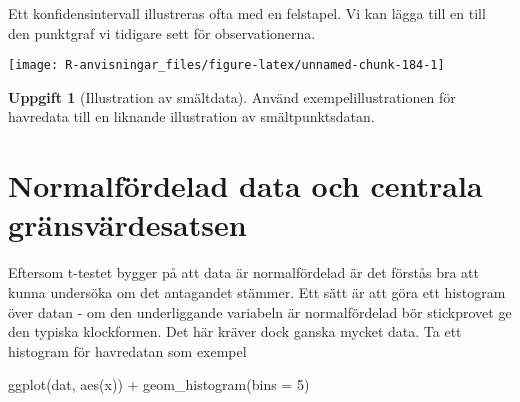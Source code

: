 \documentclass[
]{book}
\newenvironment{Shaded}{\begin{snugshade}}{\end{snugshade}}
\newcommand{\AttributeTok}[1]{\textcolor[rgb]{0.77,0.63,0.00}{#1}}
\newcommand{\DecValTok}[1]{\textcolor[rgb]{0.00,0.00,0.81}{#1}}
\newcommand{\FloatTok}[1]{\textcolor[rgb]{0.00,0.00,0.81}{#1}}
\newcommand{\FunctionTok}[1]{\textcolor[rgb]{0.00,0.00,0.00}{#1}}
\newcommand{\NormalTok}[1]{#1}
\newcommand{\OtherTok}[1]{\textcolor[rgb]{0.56,0.35,0.01}{#1}}
\newcommand{\SpecialCharTok}[1]{\textcolor[rgb]{0.00,0.00,0.00}{#1}}
\newcommand{\StringTok}[1]{\textcolor[rgb]{0.31,0.60,0.02}{#1}}
\theoremstyle{definition}
\theoremstyle{definition}
\theoremstyle{definition}
\newtheorem{exercise}{Uppgift}[chapter]
\theoremstyle{definition}
\theoremstyle{remark}
\begin{document}
Ett konfidensintervall illustreras ofta med en felstapel. Vi kan lägga till en till den punktgraf vi tidigare sett för observationerna.

\begin{Shaded}
\end{Shaded}

\begin{center}\texttt{[image: R-anvisningar\_files/figure-latex/unnamed-chunk-184-1]} \end{center}

\begin{exercise}[Illustration av smältdata]
Använd exempelillustrationen för havredata till en liknande illustration av smältpunktsdatan.
\end{exercise}

\hypertarget{normalfuxf6rdelad-data-och-centrala-gruxe4nsvuxe4rdesatsen}{%
\section{Normalfördelad data och centrala gränsvärdesatsen}\label{normalfuxf6rdelad-data-och-centrala-gruxe4nsvuxe4rdesatsen}}

Eftersom t-testet bygger på att data är normalfördelad är det förstås bra att kunna undersöka om det antagandet stämmer. Ett sätt är att göra ett histogram över datan - om den underliggande variabeln är normalfördelad bör stickprovet ge den typiska klockformen. Det här kräver dock ganska mycket data. Ta ett histogram för havredatan som exempel

\begin{Shaded}
\begin{Highlighting}[]
\FunctionTok{ggplot}\NormalTok{(dat, }\FunctionTok{aes}\NormalTok{(x)) }\SpecialCharTok{+} \FunctionTok{geom\_histogram}\NormalTok{(}\AttributeTok{bins =} \DecValTok{5}\NormalTok{)}
\end{Highlighting}
\end{Shaded}
\end{document}

